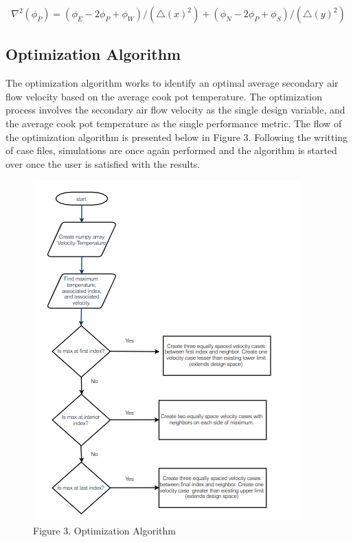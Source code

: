 \documentclass[3p,times,twocolumn]{elsarticle}
\begin{document}
\[\nabla^{2}(\phi_{P}) = (\phi_{E}-2\phi_{P} +\phi_{W})/(\triangle(x)^{2}) + (\phi_{N}-2\phi_{P} + \phi_{S})/(\triangle(y)^{2})\]

\subsection{Optimization Algorithm}
The optimization algorithm works to identify an optimal average secondary air flow velocity based on the average cook pot temperature. The optimization process involves the secondary air flow velocity as the single design variable, and the average cook pot temperature as the single performance metric. The flow of the optimization algorithm is presented below in Figure 3. Following the writting of case files, simulations are once again performed and the algorithm is started over once the user is satisfied with the results.

\begin{figure}{\linewidth}
	\includegraphics[width=\linewidth]{algorithm.PNG}
	\caption{Figure 3. Optimization Algorithm}
\end{figure}
\end{document}
